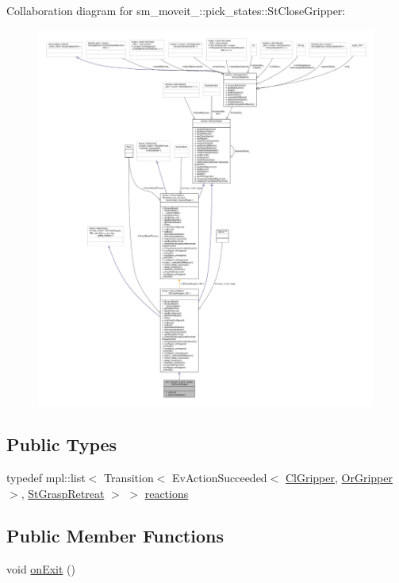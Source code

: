 Collaboration diagram for sm\+\_\+moveit\+\_\+:\+:pick\+\_\+states\+:\+:St\+Close\+Gripper\+:
\nopagebreak
\begin{figure}[H]
\begin{center}
\leavevmode
\includegraphics[width=350pt]{structsm__moveit__2_1_1pick__states_1_1StCloseGripper__coll__graph}
\end{center}
\end{figure}
\subsection*{Public Types}
\begin{DoxyCompactItemize}
\item 
typedef mpl\+::list$<$ Transition$<$ Ev\+Action\+Succeeded$<$ \hyperlink{classsm__moveit__2_1_1cl__gripper_1_1ClGripper}{Cl\+Gripper}, \hyperlink{classsm__moveit__2_1_1OrGripper}{Or\+Gripper} $>$, \hyperlink{structsm__moveit__2_1_1pick__states_1_1StGraspRetreat}{St\+Grasp\+Retreat} $>$ $>$ \hyperlink{structsm__moveit__2_1_1pick__states_1_1StCloseGripper_aa39a8b548154a4387b5ca75205d6b8e2}{reactions}
\end{DoxyCompactItemize}
\subsection*{Public Member Functions}
\begin{DoxyCompactItemize}
\item 
void \hyperlink{structsm__moveit__2_1_1pick__states_1_1StCloseGripper_a8beccb0dbff11d4f8109d943144f7632}{on\+Exit} ()
\end{DoxyCompactItemize}
